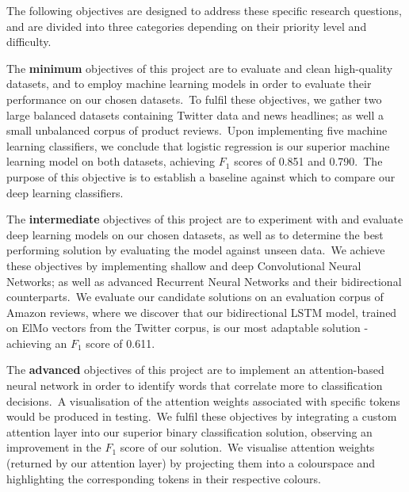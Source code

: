 \documentclass[12pt,a4paper]{article}
\begin{document}
\noindent The following objectives are designed to address these specific research questions, and are divided into three categories depending on their priority level and difficulty. 

The \textbf{minimum} objectives of this project are to evaluate and clean high-quality datasets, and to employ machine learning models in order to evaluate their performance on our chosen datasets.\ To fulfil these objectives, we gather two large balanced datasets containing Twitter data and news headlines; as well a small unbalanced corpus of product reviews.\ Upon implementing five machine learning classifiers, we conclude that logistic regression is our superior machine learning model on both datasets, achieving  $F_{1}$ scores of 0.851 and 0.790.\ The purpose of this objective is to establish a baseline against which to compare our deep learning classifiers.

The \textbf{intermediate} objectives of this project are to experiment with and evaluate deep learning models on our chosen datasets, as well as to determine the best performing solution by evaluating the model against unseen data.\ We achieve these objectives by implementing shallow and deep Convolutional Neural Networks; as well as advanced Recurrent Neural Networks and their bidirectional counterparts.\ We evaluate our candidate solutions on an evaluation corpus of Amazon reviews, where we discover that our bidirectional LSTM model, trained on ElMo vectors from the Twitter corpus, is our most adaptable solution - achieving an $F_1$ score of 0.611.
 
The \textbf{advanced} objectives of this project are to implement an attention-based neural network in order to identify words that correlate more to classification decisions.\ A visualisation of the attention weights associated with specific tokens would be produced in testing.\ We fulfil these objectives by integrating a custom attention layer into our superior binary classification solution, observing an improvement in the $F_1$ score of our solution.\ We visualise attention weights (returned by our attention layer) by projecting them into a colourspace and highlighting the corresponding tokens in their respective colours.

\end{document}
